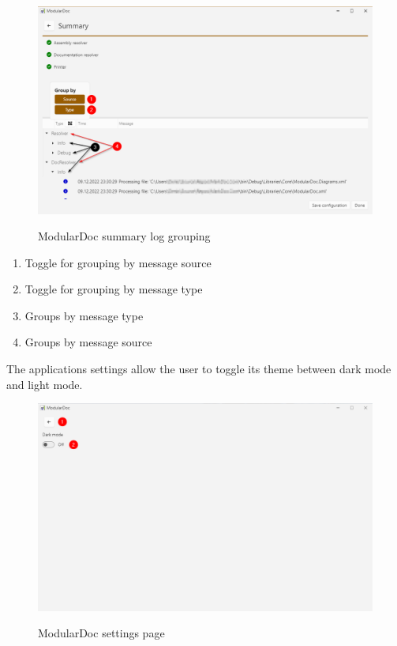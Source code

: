 \begin{figure}[H]
    \includegraphics[width=\linewidth]{img/modularDocSummaryLogGroupping.png}
    \label{fig:modularDocSummaryGroupingPage}
    \caption{ModularDoc summary log grouping}
\end{figure}

\begin{enumerate}
    \item Toggle for grouping by message source
    \item Toggle for grouping by message type
    \item Groups by message type
    \item Groups by message source
\end{enumerate}

\pagebreak
The applications settings allow the user to toggle its theme between dark mode and light mode.

\begin{figure}[H]
    \includegraphics[width=\linewidth]{img/modularDocSettings.png}
    \label{fig:modularDocSettingsPage}
    \caption{ModularDoc settings page}
\end{figure}

